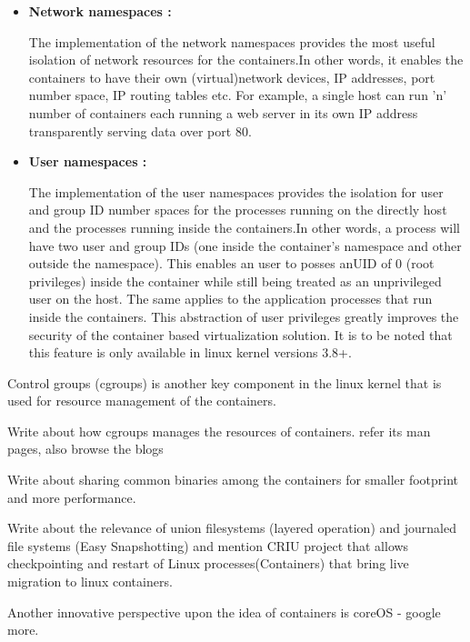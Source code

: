 \begin{itemize}
\item \textbf{Network namespaces :}

The implementation of the network namespaces provides the most useful isolation of network resources for the containers.In other words, it enables the containers to have their own (virtual)network devices, IP addresses, port number space, IP routing tables etc. For example, a single host can run 'n' number of containers each running a web server in its own IP address transparently serving data over port 80.


\item \textbf{User namespaces :}

The implementation of the user namespaces provides the isolation for user and group ID number spaces for the processes running on the directly host and the processes running inside the containers.In other words, a process will have two user and group IDs (one inside the container's namespace and other outside the namespace). This enables an user to posses anUID of 0 (root privileges) inside the container while still being treated as an unprivileged user on the host. The same applies to the application processes that run inside the containers. This abstraction of user privileges greatly improves the security of the container based virtualization solution. It is to be noted that this feature is only available in linux kernel versions 3.8+.
\end{itemize}




Control groups (cgroups) \cite{cgroups} is another key component in the linux kernel that is used for resource management of the containers.

Write about how cgroups manages the resources of containers.
refer its man pages, also browse the blogs

Write about sharing common binaries among the containers for smaller footprint and more performance. 

Write about the relevance of union filesystems (layered operation) and journaled file systems (Easy Snapshotting) and mention CRIU project that allows checkpointing and restart of Linux processes(Containers) that bring live migration to linux containers.

Another innovative perspective upon the idea of containers is coreOS - google more.



